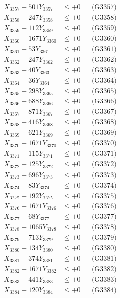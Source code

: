 \documentclass[a4paper,10pt]{article}
\begin{document}
{\begin{align}
X_{3357} - 501Y_{3357} &\leq +0 && \text{(G3357)} \\
X_{3358} - 247Y_{3358} &\leq +0 && \text{(G3358)} \\
X_{3359} - 112Y_{3359} &\leq +0 && \text{(G3359)} \\
X_{3360} - 1671Y_{3360} &\leq +0 && \text{(G3360)} \\
\allowbreak
X_{3361} - 53Y_{3361} &\leq +0 && \text{(G3361)} \\
X_{3362} - 247Y_{3362} &\leq +0 && \text{(G3362)} \\
X_{3363} - 40Y_{3363} &\leq +0 && \text{(G3363)} \\
X_{3364} - 36Y_{3364} &\leq +0 && \text{(G3364)} \\
X_{3365} - 298Y_{3365} &\leq +0 && \text{(G3365)} \\
X_{3366} - 688Y_{3366} &\leq +0 && \text{(G3366)} \\
X_{3367} - 871Y_{3367} &\leq +0 && \text{(G3367)} \\
X_{3368} - 416Y_{3368} &\leq +0 && \text{(G3368)} \\
X_{3369} - 621Y_{3369} &\leq +0 && \text{(G3369)} \\
X_{3370} - 1671Y_{3370} &\leq +0 && \text{(G3370)} \\
\allowbreak
X_{3371} - 115Y_{3371} &\leq +0 && \text{(G3371)} \\
X_{3372} - 125Y_{3372} &\leq +0 && \text{(G3372)} \\
X_{3373} - 696Y_{3373} &\leq +0 && \text{(G3373)} \\
X_{3374} - 83Y_{3374} &\leq +0 && \text{(G3374)} \\
X_{3375} - 192Y_{3375} &\leq +0 && \text{(G3375)} \\
X_{3376} - 1671Y_{3376} &\leq +0 && \text{(G3376)} \\
X_{3377} - 68Y_{3377} &\leq +0 && \text{(G3377)} \\
X_{3378} - 1065Y_{3378} &\leq +0 && \text{(G3378)} \\
X_{3379} - 713Y_{3379} &\leq +0 && \text{(G3379)} \\
X_{3380} - 134Y_{3380} &\leq +0 && \text{(G3380)} \\
\allowbreak
X_{3381} - 374Y_{3381} &\leq +0 && \text{(G3381)} \\
X_{3382} - 1671Y_{3382} &\leq +0 && \text{(G3382)} \\
X_{3383} - 441Y_{3383} &\leq +0 && \text{(G3383)} \\
X_{3384} - 120Y_{3384} &\leq +0 && \text{(G3384)} \\

\end{align}}
\end{document}
